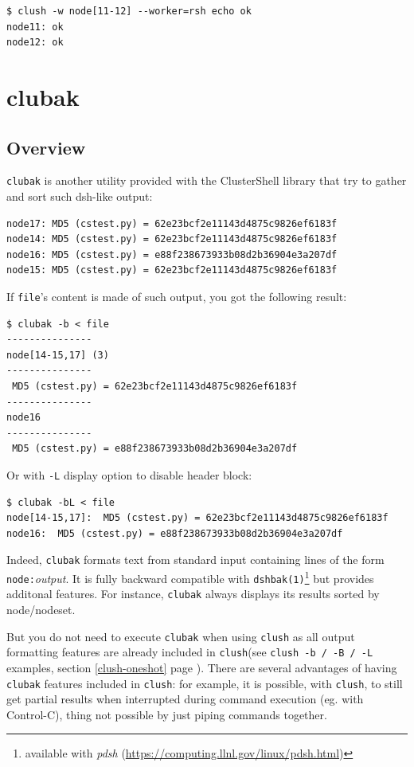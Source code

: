\documentclass[english,a4paper]{csuserguide}
\newcommand{\clush}{\texttt{clush}\xspace}
\newcommand{\clubak}{\texttt{clubak}\xspace}
\begin{document}
\begin{lstlisting}[breaklines=true, breakatwhitespace=true]
$ clush -w node[11-12] --worker=rsh echo ok
node11: ok
node12: ok
\end{lstlisting}


\section{clubak}

\subsection{Overview}
\clubak is another utility provided with the ClusterShell library that try to gather and sort such dsh-like output:
\begin{verbatim}
node17: MD5 (cstest.py) = 62e23bcf2e11143d4875c9826ef6183f
node14: MD5 (cstest.py) = 62e23bcf2e11143d4875c9826ef6183f
node16: MD5 (cstest.py) = e88f238673933b08d2b36904e3a207df
node15: MD5 (cstest.py) = 62e23bcf2e11143d4875c9826ef6183f
\end{verbatim}


If \verb+file+'s content is made of such output, you got the following result:
\medskip
\begin{lstlisting}[breaklines=true, breakatwhitespace=true]
$ clubak -b < file 
---------------
node[14-15,17] (3)
---------------
 MD5 (cstest.py) = 62e23bcf2e11143d4875c9826ef6183f
---------------
node16
---------------
 MD5 (cstest.py) = e88f238673933b08d2b36904e3a207df
\end{lstlisting}

Or with \verb+-L+ display option to disable header block:
\medskip
\begin{lstlisting}[breaklines=true, breakatwhitespace=true]
$ clubak -bL < file
node[14-15,17]:  MD5 (cstest.py) = 62e23bcf2e11143d4875c9826ef6183f
node16:  MD5 (cstest.py) = e88f238673933b08d2b36904e3a207df
\end{lstlisting}

Indeed, \clubak formats text from standard input containing lines of the form \verb+node:+\textit{output}.  It is fully backward compatible with \verb+dshbak(1)+\footnote{available with \textit{pdsh} (\url{https://computing.llnl.gov/linux/pdsh.html})} but provides additonal features.  For instance, \clubak always displays its results sorted by node/nodeset.

But you do not need to execute \clubak when using \clush as all output formatting features are already included in \clush (see \verb+clush -b / -B / -L+ examples, section \ref{clush-oneshot} page \pageref{clush-oneshot}). There are several advantages of having \clubak features included in \clush: for example, it is possible, with \clush, to still get partial results when interrupted during command execution (eg. with Control-C), thing not possible by just piping commands together.
\end{document}
